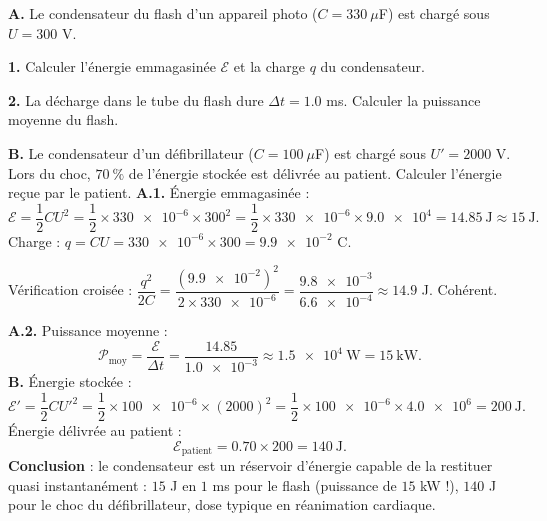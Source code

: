 \documentclass[11pt]{article}
\begin{document}
\begin{exoresolu}
\textbf{A.} Le condensateur du flash d'un appareil photo ($C = \num{330}~\mu$F) est chargé sous $U = \num{300}$ V.\par
\textbf{1.} Calculer l'énergie emmagasinée $\mathcal{E}$ et la charge $q$ du condensateur.\par
\textbf{2.} La décharge dans le tube du flash dure $\Delta t = \num{1,0}$ ms. Calculer la puissance moyenne du flash.\par
\textbf{B.} Le condensateur d'un défibrillateur ($C = \num{100}~\mu$F) est chargé sous $U' = \num{2000}$ V. Lors du choc, $70~\%$ de l'énergie stockée est délivrée au patient. Calculer l'énergie reçue par le patient.
\tcblower
\textbf{A.1.} Énergie emmagasinée :
\[ \mathcal{E} = \dfrac{1}{2}CU^2 = \dfrac{1}{2}\times\num{330e-6}\times 300^2 = \dfrac{1}{2}\times\num{330e-6}\times\num{9,0e4} = \num{14,85}~\text{J} \approx \num{15}~\text{J}. \]
Charge : $q = CU = \num{330e-6}\times 300 = \num{9,9e-2}$ C.\par
Vérification croisée : $\dfrac{q^2}{2C} = \dfrac{(\num{9,9e-2})^2}{2\times\num{330e-6}} = \dfrac{\num{9,8e-3}}{\num{6,6e-4}} \approx \num{14,9}$ J. Cohérent.\par
\textbf{A.2.} Puissance moyenne :
\[ \mathcal{P}_{\text{moy}} = \dfrac{\mathcal{E}}{\Delta t} = \dfrac{\num{14,85}}{\num{1,0e-3}} \approx \num{1,5e4}~\text{W} = \num{15}~\text{kW}. \]
\textbf{B.} Énergie stockée :
\[ \mathcal{E}' = \dfrac{1}{2}C{U'}^2 = \dfrac{1}{2}\times\num{100e-6}\times (2000)^2 = \dfrac{1}{2}\times\num{100e-6}\times\num{4,0e6} = \num{200}~\text{J}. \]
Énergie délivrée au patient :
\[ \mathcal{E}_{\text{patient}} = \num{0,70}\times 200 = \num{140}~\text{J}. \]
\textbf{Conclusion} : le condensateur est un réservoir d'énergie capable de la restituer quasi instantanément : $15$ J en $1$ ms pour le flash (puissance de $15$ kW !), $140$ J pour le choc du défibrillateur, dose typique en réanimation cardiaque.
\end{exoresolu}
\end{document}

